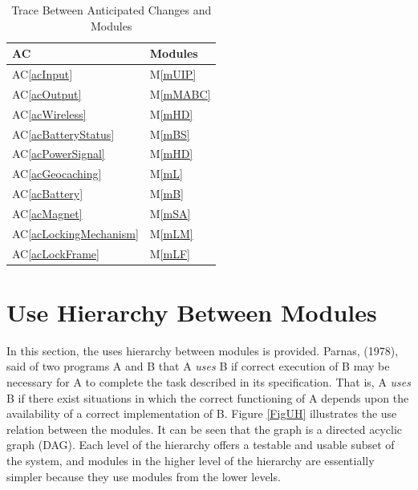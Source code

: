\documentclass[12pt, titlepage]{article}
\newcommand{\acref}[1]{AC\ref{#1}}
\newcommand{\mref}[1]{M\ref{#1}}
\begin{document}
\begin{table}[H]
\centering
\begin{tabular}{p{} p{}}
\toprule
\textbf{AC} & \textbf{Modules}\\
\midrule
\acref{acInput} & \mref{mUIP}\\
\acref{acOutput} & \mref{mMABC}\\
\acref{acWireless} & \mref{mHD}\\
\acref{acBatteryStatus} & \mref{mBS}\\
\acref{acPowerSignal} & \mref{mHD}\\
\acref{acGeocaching} & \mref{mL}\\
\acref{acBattery} & \mref{mB}\\
\acref{acMagnet} & \mref{mSA}\\
\acref{acLockingMechanism} & \mref{mLM}\\
\acref{acLockFrame} & \mref{mLF}\\
\bottomrule
\end{tabular}
\caption{Trace Between Anticipated Changes and Modules}
\label{TblACT}
\end{table}

\section{Use Hierarchy Between Modules} \label{SecUse}

In this section, the uses hierarchy between modules is
provided. Parnas, (1978), said of two programs A and B that A {\em uses} B if
correct execution of B may be necessary for A to complete the task described in
its specification. That is, A {\em uses} B if there exist situations in which
the correct functioning of A depends upon the availability of a correct
implementation of B.  Figure \ref{FigUH} illustrates the use relation between
the modules. It can be seen that the graph is a directed acyclic graph
(DAG). Each level of the hierarchy offers a testable and usable subset of the
system, and modules in the higher level of the hierarchy are essentially simpler
because they use modules from the lower levels.
\end{document}
